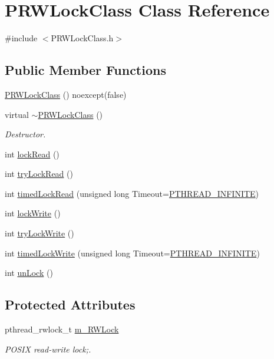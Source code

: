 \hypertarget{classPRWLockClass}{}\section{P\+R\+W\+Lock\+Class Class Reference}
\label{classPRWLockClass}


{\ttfamily \#include $<$P\+R\+W\+Lock\+Class.\+h$>$}

\subsection*{Public Member Functions}
\begin{DoxyCompactItemize}
\item 
\hyperlink{classPRWLockClass_ac59b2064213975c386238642138d1b6b}{P\+R\+W\+Lock\+Class} () noexcept(false)
\item 
virtual \hyperlink{classPRWLockClass_a88c4b20ab74e7169502b150c21ddcb7b}{$\sim$\+P\+R\+W\+Lock\+Class} ()
\begin{DoxyCompactList}\small\item\em Destructor. \end{DoxyCompactList}\item 
int \hyperlink{classPRWLockClass_a46653617ca027a5c1606cbe15024beda}{lock\+Read} ()
\item 
int \hyperlink{classPRWLockClass_a20f4dadadb861f8d3784e42ed79c5644}{try\+Lock\+Read} ()
\item 
int \hyperlink{classPRWLockClass_aea260fd7b6edbed8f3e4ed45c5f2dd10}{timed\+Lock\+Read} (unsigned long Timeout=\hyperlink{PThreadClassLib_8h_a9d2d74d73cb5d069fbfcbcfebf42bd6e}{P\+T\+H\+R\+E\+A\+D\+\_\+\+I\+N\+F\+I\+N\+I\+TE})
\item 
int \hyperlink{classPRWLockClass_a685bacbde4d64ec46d2107c69707ff6a}{lock\+Write} ()
\item 
int \hyperlink{classPRWLockClass_aad1a8144616e233d02a12437a5f5d74f}{try\+Lock\+Write} ()
\item 
int \hyperlink{classPRWLockClass_a4b4571cc739699bfcc7b62543c173dec}{timed\+Lock\+Write} (unsigned long Timeout=\hyperlink{PThreadClassLib_8h_a9d2d74d73cb5d069fbfcbcfebf42bd6e}{P\+T\+H\+R\+E\+A\+D\+\_\+\+I\+N\+F\+I\+N\+I\+TE})
\item 
int \hyperlink{classPRWLockClass_a4b3f36ee6e3d4996e7b43ea6e4819144}{un\+Lock} ()
\end{DoxyCompactItemize}
\subsection*{Protected Attributes}
\begin{DoxyCompactItemize}
\item 
pthread\+\_\+rwlock\+\_\+t \hyperlink{classPRWLockClass_aaa565eaea0c0e07a70fd6bdbb8f5693e}{m\+\_\+\+R\+W\+Lock}
\begin{DoxyCompactList}\small\item\em P\+O\+S\+IX read-\/write lock;. \end{DoxyCompactList}\end{DoxyCompactItemize}



